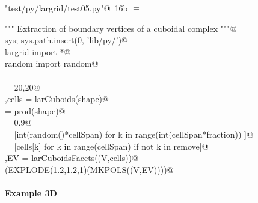 \documentclass[11pt,oneside]{article}	%
\begin{document}
\begin{flushleft} \small \label{scrap24}
\protect{}\verb@"test/py/largrid/test05.py"@\nobreak\ {\footnotesize 16b }$\equiv$
\vspace{-1ex}
\begin{list}{}{} \item
\mbox{}\verb@""" Extraction of boundary vertices of a cuboidal complex """@\\
\mbox{}\verb@import sys; sys.path.insert(0, 'lib/py/')@\\
\mbox{}\verb@from largrid import *@\\
\mbox{}\verb@from random import random@\\
\mbox{}\verb@@\\
\mbox{}\verb@shape = 20,20@\\
\mbox{}\verb@V,cells = larCuboids(shape)@\\
\mbox{}\verb@cellSpan = prod(shape)@\\
\mbox{}\verb@fraction = 0.9@\\
\mbox{}\verb@remove = [int(random()*cellSpan) for k in range(int(cellSpan*fraction)) ]@\\
\mbox{}\verb@cells = [cells[k] for k in range(cellSpan) if not k in remove]@\\
\mbox{}\verb@V,EV = larCuboidsFacets((V,cells))@\\
\mbox{}\verb@VIEW(EXPLODE(1.2,1.2,1)(MKPOLS((V,EV))))@\\
\mbox{}\verb@@{\NWsep}
\end{list}
\vspace{-2ex}
\end{flushleft}

\paragraph{Example 3D}
\end{document}
